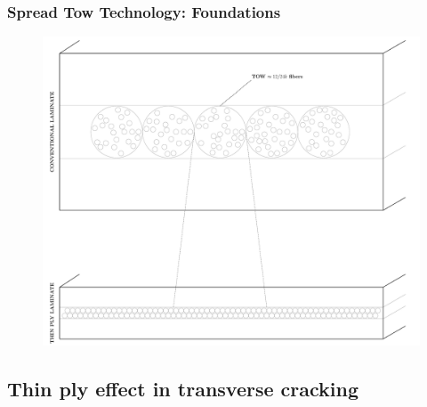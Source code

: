 \documentclass[first,firstsupp,lastsupp,handout,last,hyperref,table]{ETHclass}
\begin{document}
\begin{frame}
\frametitle{Spread Tow Technology: Foundations}
\vspace{-0.5cm}
\centering
\begin{figure}
\centering
\includegraphics[height=0.85\textheight]{spread-tow-tech.pdf}
\label{fig:spread-tow-schematic}
\end{figure}
\end{frame}

\subsection{Thin ply effect in transverse cracking}
\end{document}
